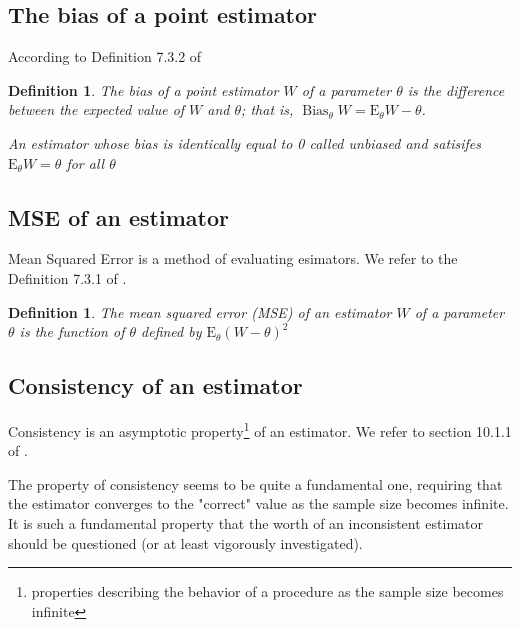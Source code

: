 \documentclass[12pt]{article}
\newtheorem{defn}[thm]{Definition}
\theoremstyle{definition}
\begin{document}
\subsection{The bias of a point estimator}
According to Definition 7.3.2 of \cite{casella2002statistical}

\begin{defn}
	The bias of a point estimator $W$ of a parameter $\theta$ is the difference between the expected value of $W$ and $\theta$; that is, $\operatorname{Bias}_{\theta} W=\mathrm{E}_{\theta} W-\theta$. 
	
	An estimator whose bias is identically equal to 0 called unbiased and satisifes $\mathrm{E}_{\theta} W=\theta$ for all $\theta$
\end{defn}

\subsection{MSE of an estimator}
Mean Squared Error is a method of evaluating esimators. We refer to the Definition 7.3.1 of \cite{casella2002statistical}.

\begin{defn}
	The mean squared error (MSE) of an estimator $W$ of a parameter $\theta$  is the function of $\theta$ defined by $\mathrm{E}_{\theta}(W-\theta)^{2}$
\end{defn}

\subsection{Consistency of an estimator}

Consistency is an asymptotic property\footnote{properties describing the behavior of a procedure as the sample size becomes infinite} of an estimator.
We refer to section 10.1.1 of \cite{casella2002statistical}. 

The property of consistency seems to be quite a fundamental one, requiring that the estimator converges to the "correct" value as the sample size becomes infinite. It is such a fundamental property that the worth of an inconsistent estimator should be questioned (or at least vigorously investigated).
\end{document}
